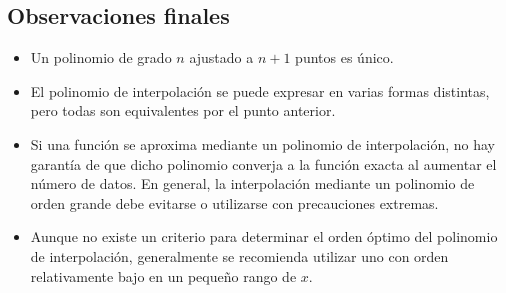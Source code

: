 \documentclass[]{book}
\providecommand{\tightlist}{%
  \setlength{\itemsep}{0pt}\setlength{\parskip}{0pt}}
\begin{document}
\hypertarget{observaciones-finales}{%
\subsection{Observaciones finales}\label{observaciones-finales}}

\begin{itemize}
\tightlist
\item
  Un polinomio de grado \(n\) ajustado a \(n+1\) puntos es único.
\item
  El polinomio de interpolación se puede expresar en varias formas distintas, pero todas son equivalentes por el punto anterior.
\item
  Si una función se aproxima mediante un polinomio de interpolación, no hay garantía de que dicho polinomio converja a la función exacta al aumentar el número de datos. En general, la interpolación mediante un polinomio de orden grande debe evitarse o utilizarse con precauciones extremas.
\item
  Aunque no existe un criterio para determinar el orden óptimo del polinomio de interpolación, generalmente se recomienda utilizar uno con orden relativamente bajo en un pequeño rango de \(x\).
\end{itemize}
\end{document}
